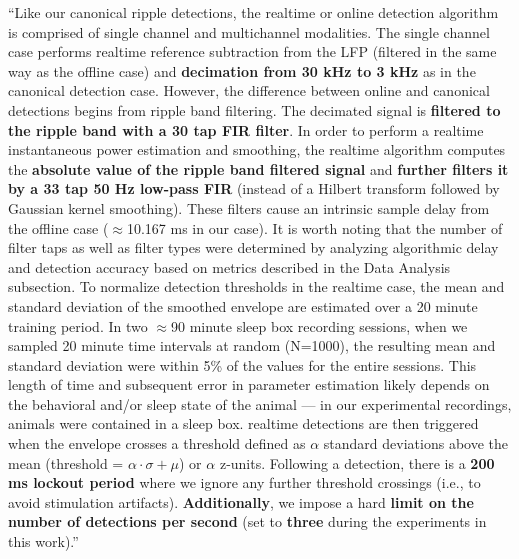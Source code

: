 \begin{quotebar}
``Like our canonical ripple detections, the realtime or online detection algorithm is comprised of single channel and multichannel modalities. The single channel case performs realtime reference subtraction from the LFP (filtered in the same way as the offline case) and \textbf{decimation from 30 kHz to 3 kHz} as in the canonical detection case. However, the difference between online and canonical detections begins from ripple band filtering. The decimated signal is \textbf{filtered to the ripple band with a 30 tap FIR filter}. In order to perform a realtime instantaneous power estimation and smoothing, the realtime algorithm computes the \textbf{absolute value of the ripple band filtered signal} and \textbf{further filters it by a 33 tap 50 Hz low-pass FIR} (instead of a Hilbert transform followed by Gaussian kernel smoothing). These filters cause an intrinsic sample delay from the offline case ($\approx$10.167 ms in our case). It is worth noting that the number of filter taps as well as filter types were determined by analyzing algorithmic delay and detection accuracy based on metrics described in the Data Analysis subsection. To normalize detection thresholds in the realtime case, the mean and standard deviation of the smoothed envelope are estimated over a 20 minute training period. In two $\approx$90 minute sleep box recording sessions, when we sampled 20 minute time intervals at random (N=1000), the resulting mean and standard deviation were within 5\% of the values for the entire sessions. This length of time and subsequent error in parameter estimation likely depends on the behavioral and/or sleep state of the animal — in our experimental recordings, animals were contained in a sleep box. realtime detections are then triggered when the envelope crosses a threshold defined as $\alpha$ standard deviations above the mean (threshold = $\alpha \cdot \sigma + \mu$) or $\alpha$ z-units. Following a detection, there is a \textbf{200 ms lockout period} where we ignore any further threshold crossings (i.e., to avoid stimulation artifacts). \textbf{Additionally}, we impose a hard \textbf{limit on the number of detections per second} (set to \textbf{three} during the experiments in this work).'' \cite{Dutta2018}
\end{quotebar}
